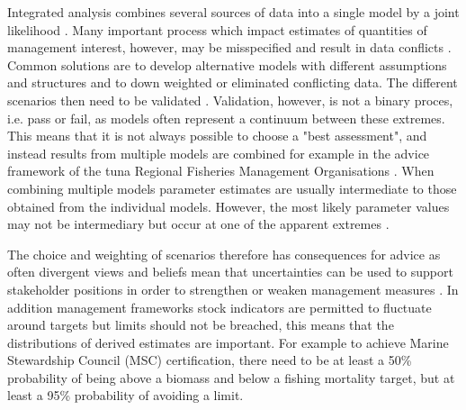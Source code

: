 \documentclass[a4paper]{article}
\begin{document}
Integrated analysis combines several sources of data into a single model by a joint likelihood \citep[e.g][]{maunder2013review}. Many important process which impact estimates of quantities of management interest, however, may be misspecified and result in data conflicts \citep{carvalho2017can}. Common solutions are to develop alternative models with different assumptions and structures and to down weighted or eliminated conflicting data.  The different scenarios then need to be validated \citep[e.g.][]{kell2020validation}. Validation, however, is not a binary proces, i.e. pass or fail, as models often represent a continuum between these extremes. This means that it is not always possible to choose a "best assessment", and instead results from multiple models are combined \citep{brodziak2005model} for example in the advice framework of the tuna Regional Fisheries Management Organisations \citep[RFMOs][]{kell2016quantification}. When combining multiple models parameter estimates are usually intermediate to those obtained from the individual models. However, the most likely parameter values may not be intermediary but occur at one of the apparent extremes \citep{schnute1993analysis}. 

The choice and weighting of scenarios therefore has consequences for advice as often divergent views and beliefs mean that uncertainties can be used to support stakeholder positions in order to strengthen or weaken management measures \citep{fromentin2014spectre}. In addition management frameworks stock indicators are permitted to fluctuate around targets but limits should not be breached, this means that the distributions of derived estimates are important. For example to achieve Marine Stewardship Council (MSC) certification, there need to be at least a 50\% probability of being above a biomass and below a fishing mortality target, but at least a 95\% probability of avoiding a limit. %
\end{document}
